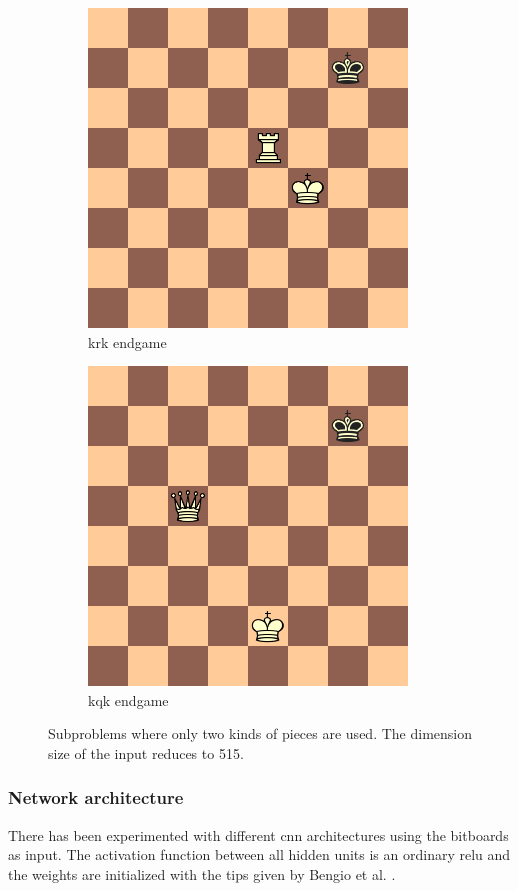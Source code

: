 \begin{figure}
    \centering
    \begin{subfigure}[b]{0.4\textwidth}
        \includegraphics[scale=0.5]{fig/krk}
        \caption{\gls{krk} endgame}
        \label{fig:krk}
    \end{subfigure}
    \qquad
    \begin{subfigure}[b]{0.4\textwidth}
         \includegraphics[scale=0.5]{fig/kqk}
        \caption{\gls{kqk} endgame}
        \label{fig:kqk}
    \end{subfigure}
    \caption[End games]{Subproblems where only two kinds of pieces are used. The dimension size of the input reduces to 515.}
    \label{fig:subprob}
\end{figure}

\subsubsection*{Network architecture}
There has been experimented with different \gls{cnn} architectures using the bitboards as input. The activation function between all hidden units is an ordinary \gls{relu} and the weights are initialized with the tips given by Bengio et al. \cite{init}.\\

